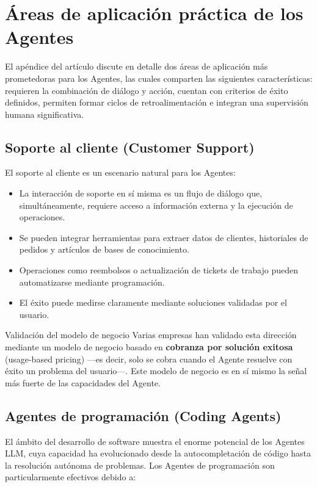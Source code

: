\section{Áreas de aplicación práctica de los Agentes}

El apéndice del artículo discute en detalle dos áreas de aplicación más prometedoras para los Agentes, las cuales comparten las siguientes características: requieren la combinación de diálogo y acción, cuentan con criterios de éxito definidos, permiten formar ciclos de retroalimentación e integran una supervisión humana significativa.

\subsection{Soporte al cliente (Customer Support)}

El soporte al cliente es un escenario natural para los Agentes:

\begin{itemize}
    \item La interacción de soporte en sí misma es un flujo de diálogo que, simultáneamente, requiere acceso a información externa y la ejecución de operaciones.
    \item Se pueden integrar herramientas para extraer datos de clientes, historiales de pedidos y artículos de bases de conocimiento.
    \item Operaciones como reembolsos o actualización de tickets de trabajo pueden automatizarse mediante programación.
    \item El éxito puede medirse claramente mediante soluciones validadas por el usuario.
\end{itemize}

\begin{knowledgebox}{Validación del modelo de negocio}
Varias empresas han validado esta dirección mediante un modelo de negocio basado en \textbf{cobranza por solución exitosa} (usage-based pricing) —es decir, solo se cobra cuando el Agente resuelve con éxito un problema del usuario—. Este modelo de negocio es en sí mismo la señal más fuerte de las capacidades del Agente.
\end{knowledgebox}

\subsection{Agentes de programación (Coding Agents)}

El ámbito del desarrollo de software muestra el enorme potencial de los Agentes LLM, cuya capacidad ha evolucionado desde la autocompletación de código hasta la resolución autónoma de problemas. Los Agentes de programación son particularmente efectivos debido a:

